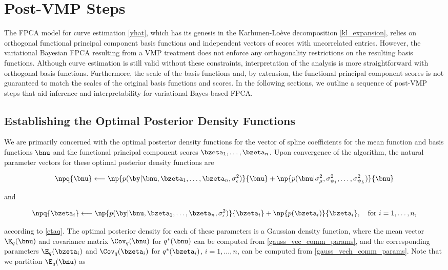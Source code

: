 \documentclass[12pt]{article}
\def\sigsqeps{\sigma^2_{\epsilon}}
\def\sigsqmu{\sigma^2_{\mu}}
\newcommand\sigsqpsi[1]{\sigma^2_{\psi_{#1}}}
\theoremstyle{plain}
\theoremstyle{definition}
\theoremstyle{remark}
\begin{document}
\section{Post-VMP Steps}
\label{sec:post_vmp_steps}

The FPCA model for curve estimation \eqref{yhat}, which has its genesis in the Karhunen-Lo\`{e}ve decomposition
\eqref{kl_expansion}, relies on orthogonal functional principal component
basis functions and independent vectors of scores with uncorrelated entries.
However, the variational Bayesian FPCA resulting from a VMP treatment
does not enforce any orthogonality restrictions on the resulting basis functions. Although curve estimation is still
valid without these constraints, interpretation of the analysis is more straightforward with orthogonal basis
functions. Furthermore, the scale of the basis functions and, by extension, the functional principal component
scores is not guaranteed to match the scales of the original basis functions and scores.
In the following sections, we outline
a sequence of post-VMP steps that aid inference and interpretability for variational Bayes-based FPCA.


\subsection{Establishing the Optimal Posterior Density Functions}
\label{sec:opt_dens_funcs}

We are primarily concerned with the optimal posterior density functions for the vector of spline coefficients for
the mean function and basis functions $\bnu$ and the functional principal component scores $\bzeta_1, \dots,
\bzeta_n$. Upon convergence of the algorithm, the natural parameter vectors for these optimal posterior density
functions are

\[
	\npq{\bnu} \longleftarrow
		\np{p (\by | \bnu, \bzeta_1, \dots, \bzeta_n, \sigsqeps)}{\bnu}
		+ \np{p (\bnu | \sigsqmu, \sigsqpsi{1}, \dots, \sigsqpsi{L})}{\bnu}
\]

\noindent and

\[
	\npq{\bzeta_i} \longleftarrow
		\np{p (\by | \bnu, \bzeta_1, \dots, \bzeta_n, \sigsqeps)}{\bzeta_i}
		+ \np{p (\bzeta_i)}{\bzeta_i}, \quad
	\text{for $i = 1, \dots, n$,}
\]

\noindent according to \eqref{etaq}. The optimal posterior density for each of these parameters is a Gaussian density
function, where the mean vector $\E_q (\bnu)$ and covariance matrix $\Cov_q (\bnu)$ for $q^* (\bnu)$
can be computed from
\eqref{gauss_vec_comm_params}, and the corresponding parameters $\E_q (\bzeta_i)$ and $\Cov_q (\bzeta_i)$
for $q^* (\bzeta_i)$, $i = 1, \dots, n$, can be
computed from \eqref{gauss_vech_comm_params}. Note that we partition $\E_q (\bnu)$ as
\end{document}
